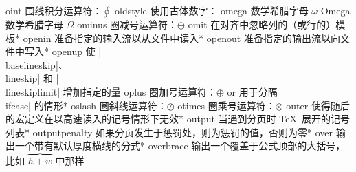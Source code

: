 \capcs oint {围线积分运算符：$\oint$}{}{}
\capcs oldstyle {使用古体数字：{}}{}{}
\capcs omega {数学希腊字母 $\omega$}{}{}
\capcs Omega {数学希腊字母 $\Omega$}{}{}
\capcs ominus {圈减号运算符：$\ominus$}{}{}
\capcs omit {在对齐中忽略列的（或行的）模板}*{}
\capcs openin {准备指定的输入流以从文件中读入}*{}
\capcs openout {准备指定的输出流以向文件中写入}*{}
\capcs openup {使 |\\baselineskip|、|\\lineskip| 和 |\\lineskiplimit| 增加指定的量}{}{}
\capcs oplus {圈加号运算符：$\oplus$}{}{}
\capcs or {用于分隔 |\\ifcase| 的情形}*{\@or}
\capcs oslash {圈斜线运算符：$\oslash$}{}{}
\capcs otimes {圈乘号运算符：$\otimes$}{}{}
\capcs outer {使得随后的宏定义在以高速读入的记号情形下无效}*{}
\capcs output {当遇到分页时 \TeX\ 展开的记号列表}*{}
\capcs outputpenalty {如果分页发生于惩罚处，则为惩罚的值，否则为零}*{}
\capcs over {输出一个带有默认厚度横线的分式}*{}
\capcs overbrace {输出一个覆盖于公式顶部的大括号，比如 $\overbrace{h+w}{}$ 中那样}{}{}
